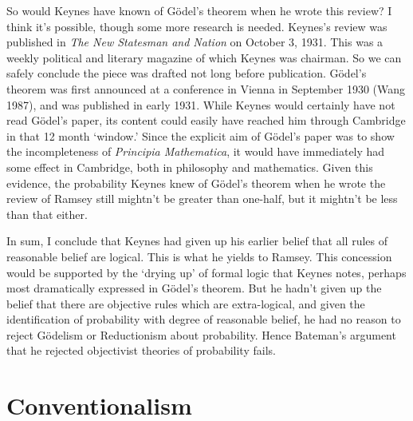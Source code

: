 \documentclass[noflushend]{philosophersimprint}
\begin{document}
So would Keynes have known of Gödel's theorem when he wrote this review?
I think it's possible, though some more research is needed. Keynes's
review was published in \emph{The New Statesman and Nation} on October
3, 1931. This was a weekly political and literary magazine of which
Keynes was chairman. So we can safely conclude the piece was drafted not
long before publication. Gödel's theorem was first announced at a
conference in Vienna in September 1930 (Wang 1987), and was published in
early 1931. While Keynes would certainly have not read Gödel's paper,
its content could easily have reached him through Cambridge in that 12
month `window.' Since the explicit aim of Gödel's paper was to show the
incompleteness of \emph{Principia Mathematica}, it would have
immediately had some effect in Cambridge, both in philosophy and
mathematics. Given this evidence, the probability Keynes knew of Gödel's
theorem when he wrote the review of Ramsey still mightn't be greater
than one-half, but it mightn't be less than that either.

In sum, I conclude that Keynes had given up his earlier belief that all
rules of reasonable belief are logical. This is what he yields to
Ramsey. This concession would be supported by the `drying up' of formal
logic that Keynes notes, perhaps most dramatically expressed in Gödel's
theorem. But he hadn't given up the belief that there are objective
rules which are extra-logical, and given the identification of
probability with degree of reasonable belief, he had no reason to reject
Gödelism or Reductionism about probability. Hence Bateman's argument
that he rejected objectivist theories of probability fails.

\hypertarget{conventionalism}{%
\section{Conventionalism}\label{conventionalism}}
\end{document}

